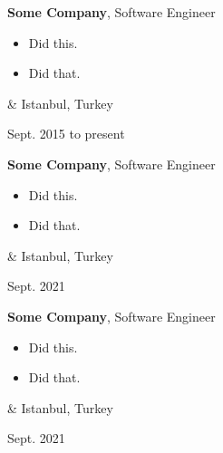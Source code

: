 \documentclass[10pt, letterpaper]{article}
\newenvironment{highlights}{
        \begin{itemize}[
                topsep=0pt,
                parsep=0.10 cm,
                partopsep=0pt,
                itemsep=0pt,
                after=\relax,
                leftmargin=0.4 cm + 3pt
            ]
    }{
        \end{itemize}
    } %
\let\originalTabularx\tabularx
\let\originalEndTabularx\endtabularx
\renewenvironment{tabularx}{\bgroup\centering\originalTabularx}{\originalEndTabularx\par\egroup}
\begin{document}
        \vspace{0.2 cm}
        \begin{tabularx}{
            \textwidth-0.4 cm-0.13cm
        }{
            K{0.2 cm}
            R{4.1 cm}
        }
            \textbf{Some Company}, Software Engineer

            \vspace{0.10 cm}

            \begin{highlights}
                \item Did this.
                \item Did that.
            \end{highlights}
            &
            Istanbul, Turkey

            Sept. 2015 to present
        \end{tabularx}

        \vspace{0.2 cm}
        \begin{tabularx}{
            \textwidth-0.4 cm-0.13cm
        }{
            K{0.2 cm}
            R{4.1 cm}
        }
            \textbf{Some Company}, Software Engineer

            \vspace{0.10 cm}

            \begin{highlights}
                \item Did this.
                \item Did that.
            \end{highlights}
            &
            Istanbul, Turkey

            Sept. 2021
        \end{tabularx}

        \vspace{0.2 cm}
        \begin{tabularx}{
            \textwidth-0.4 cm-0.13cm
        }{
            K{0.2 cm}
            R{4.1 cm}
        }
            \textbf{Some Company}, Software Engineer

            \vspace{0.10 cm}

            \begin{highlights}
                \item Did this.
                \item Did that.
            \end{highlights}
            &
            Istanbul, Turkey

            Sept. 2021
        \end{tabularx}
\end{document}
